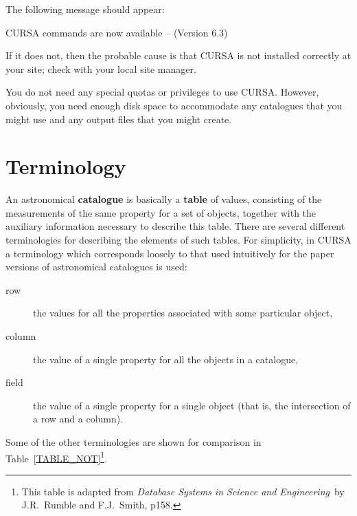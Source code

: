 \documentclass[twoside,11pt]{starlink}
\begin{document}
\begin{terminalv}
\end{terminalv}

The following message should appear:

\begin{terminalv}
CURSA commands are now available -- (Version 6.3)
\end{terminalv}

If it does not, then the probable cause is that CURSA is not installed
correctly at your site; check with your local site manager.

You do not need any special quotas or privileges to use CURSA. However,
obviously, you need enough disk space to accommodate any catalogues
that you might use and any output files that you might create.


\section{\label{COMP}Terminology}

An astronomical \textbf{catalogue} is basically a \textbf{table} of values,
consisting of the measurements of the same property for a set of
objects, together with the auxiliary information necessary to describe
this table. There are several different terminologies for describing
the elements of such tables. For simplicity, in CURSA a terminology which
corresponds loosely to that used intuitively for the paper versions of
astronomical catalogues is used:

\begin{description}

  \item[row] the values for all the properties associated with some
   particular object,

  \item[column] the value of a single property for all the objects in
   a catalogue,

  \item[field] the value of a single property for a single object
   (that is, the intersection of a row and a column).

\end{description}

Some of the other terminologies are shown for comparison in
Table~\ref{TABLE_NOT}\footnote{This table is adapted from \textit{Database Systems in Science and Engineering}\, by J.R.~Rumble and
F.J.~Smith\cite{RUMBLE}, p158.}.
\end{document}
